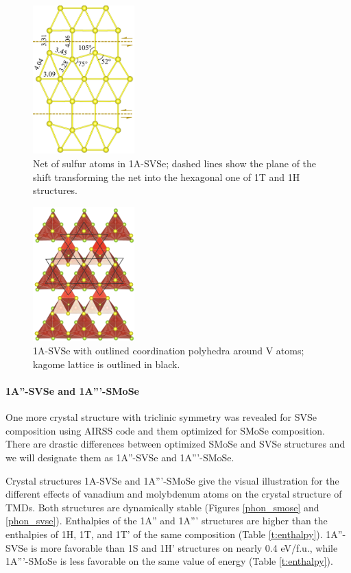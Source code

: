 \documentclass[a4paperm]{article}
\begin{document}
\begin{figure}
	\includegraphics[width=0.35\textwidth]{airss1v_s.png}
	\caption{Net of sulfur atoms in 1A-SVSe; dashed lines show the plane of the shift transforming the net into the hexagonal one of 1T and 1H structures.}
\label{airss1_s}
\end{figure}


\begin{figure}[H]
        \includegraphics[width=0.35\textwidth]{airss1_v_poly.png}
        \caption{1A-SVSe with outlined coordination polyhedra around V atoms; kagome lattice is outlined in black.}
\label{airss1_poly}
\end{figure}




\paragraph{1A''-SVSe and 1A'''-SMoSe}
One more crystal structure with triclinic symmetry was revealed for SVSe composition using AIRSS code and them optimized for SMoSe composition.
There are drastic differences between optimized SMoSe and SVSe structures and we will designate them as 1A''-SVSe and 1A'''-SMoSe.

Crystal structures  1A-SVSe and 1A'''-SMoSe give the visual illustration for the different effects of vanadium and molybdenum atoms on the crystal structure of TMDs.
Both structures are dynamically stable (Figures \ref{phon_smose} and \ref{phon_svse}).
Enthalpies of the 1A'' and 1A''' structures are higher than the enthalpies of 1H, 1T, and 1T' of the same composition (Table \ref{t:enthalpy}).
1A''-SVSe is more favorable than 1S and 1H' structures on nearly 0.4 eV/f.u., while 1A'''-SMoSe is less favorable on the same value of energy (Table \ref{t:enthalpy}).
\end{document}
